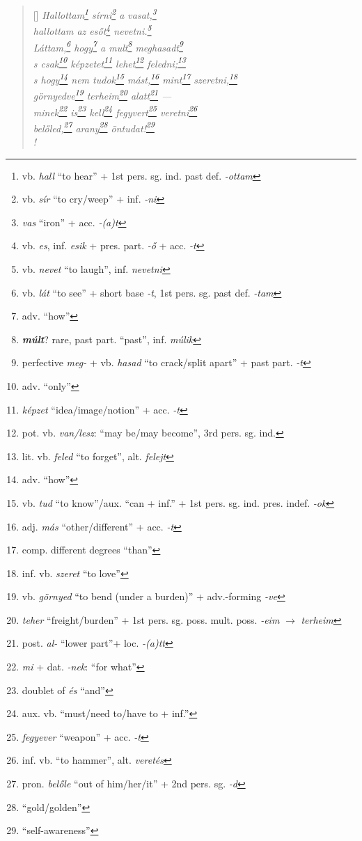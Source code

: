 \documentclass[a4paper,12pt,twoside,final]{book}
\begin{document}
\begin{verse}[\versewidth]
  \it
  Hallottam\footnote{vb. \emph{hall} ``to hear'' + 1st
  pers. sg. ind. past def. \emph{-ottam}} sírni\footnote{vb.
  \emph{sír} ``to cry/weep'' + inf. \emph{-ni}} a
  vasat,\footnote{\emph{vas} ``iron'' + acc. \emph{-(a)t}} \\
  hallottam az esőt\footnote{vb. \emph{es}, inf. \emph{esik} +
  pres. part. \emph{-ő} + acc. \emph{-t}} nevetni.\footnote{vb.
  \emph{nevet} ``to laugh'', inf. \emph{nevetni}} \\
  Láttam,\footnote{vb. \emph{lát} ``to see'' +
  short base \emph{-t}, 1st pers. sg. past def. \emph{-tam}}
  hogy\footnote{adv. ``how''} a mult\footnote{\textbf{\emph{múlt}}?
  rare, past part. ``past'', inf. \emph{múlik}}
  meghasadt\footnote{perfective \emph{meg-} + vb.
  \emph{hasad} ``to crack/split apart'' + past
  part. \emph{-t}} \\
  s csak\footnote{adv. ``only''} képzetet\footnote{\emph{képzet}
  ``idea/image/notion'' + acc. \emph{-t}}
  lehet\footnote{pot. vb. \emph{van/lesz}:
  ``may be/may become'', 3rd pers. sg. ind.}
  feledni;\footnote{lit. vb. \emph{feled} ``to forget'', alt. \emph{felejt}} \\
  s hogy\footnote{adv. ``how''} nem tudok\footnote{vb.
  \emph{tud} ``to know''/aux. ``can + inf.'' + 1st
  pers. sg. ind. pres. indef. \emph{-ok}}
  mást,\footnote{adj. \emph{más} ``other/different'' + acc. \emph{-t}}
  mint\footnote{comp. different degrees ``than''}
  szeretni,\footnote{inf. vb. \emph{szeret} ``to love''} \\
  görnyedve\footnote{vb. \emph{görnyed} ``to bend (under a
  burden)'' + adv.-forming \emph{-ve}} terheim\footnote{\emph{teher}
  ``freight/burden'' + 1st
  pers. sg. poss. mult. poss. \emph{-eim} $\rightarrow$ \emph{terheim}}
  alatt\footnote{post. \emph{al-} ``lower part''+ loc. \emph{-(a)tt}}
  --- \\
  minek\footnote{\emph{mi} + dat. \emph{-nek}: ``for what''}
  is\footnote{doublet of \emph{és} ``and''}
  kell\footnote{aux. vb. ``must/need to/have to + inf.''}
  fegyvert\footnote{\emph{fegyever} ``weapon'' + acc. \emph{-t}}
    veretni\footnote{inf. vb. ``to hammer'', alt. \emph{veretés}} \\
  belőled,\footnote{pron. \emph{belőle} ``out of him/her/it'' + 2nd
  pers. sg. \emph{-d}} arany\footnote{``gold/golden''}
  öntudat!\footnote{``self-awareness''} \\!
\end{verse}
\end{document}
